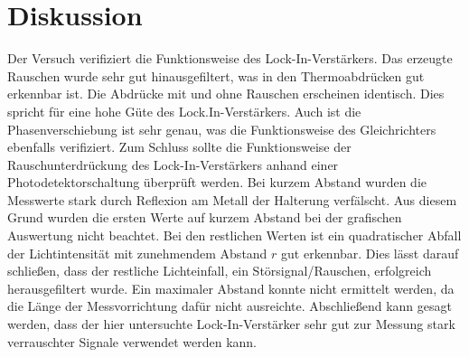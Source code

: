 \newpage
\section{Diskussion}
Der Versuch verifiziert die Funktionsweise des Lock-In-Verstärkers. Das erzeugte Rauschen wurde sehr gut hinausgefiltert, was in den Thermoabdrücken gut erkennbar ist. Die Abdrücke mit und ohne Rauschen erscheinen identisch. Dies spricht für eine hohe Güte des Lock.In-Verstärkers.
Auch ist die Phasenverschiebung ist sehr genau, was die Funktionsweise des Gleichrichters ebenfalls verifiziert. 
Zum Schluss sollte die Funktionsweise der Rauschunterdrückung des Lock-In-Verstärkers anhand einer Photodetektorschaltung überprüft werden.
Bei kurzem Abstand wurden die Messwerte stark durch Reflexion am Metall der Halterung verfälscht. Aus diesem Grund wurden die ersten Werte auf kurzem Abstand bei der grafischen Auswertung nicht beachtet. Bei den restlichen Werten ist ein quadratischer Abfall der Lichtintensität mit zunehmendem Abstand $r$ gut erkennbar. Dies lässt darauf schließen, dass der restliche Lichteinfall, ein Störsignal/Rauschen, erfolgreich herausgefiltert wurde. 
Ein maximaler Abstand konnte nicht ermittelt werden, da die Länge der Messvorrichtung dafür nicht ausreichte.
Abschließend kann gesagt werden, dass der hier untersuchte Lock-In-Verstärker sehr gut zur Messung stark verrauschter Signale verwendet werden kann.